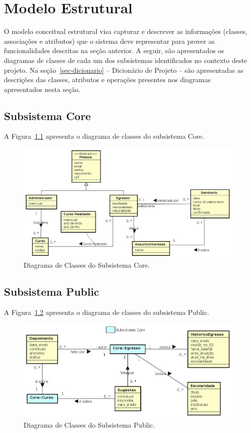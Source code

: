 
\chapter{Modelo Estrutural}
\label{sec-modelo-estrutural}

O modelo conceitual estrutural visa capturar e descrever as informações (classes, associações e atributos) que o sistema deve representar para prover as funcionalidades descritas na seção anterior. A seguir, são apresentados os diagramas de classes de cada um dos subsistemas identificados no contexto deste projeto. Na seção~\ref{sec-dicionario} – Dicionário de Projeto – são apresentadas as descrições das classes, atributos e operações presentes nos diagramas apresentados nesta seção.


\section{Subsistema Core}

A Figura~\ref{figura-core-classe} apresenta o diagrama de classes do subsistema Core.

\begin{figure}[h]
  \centering
  \includegraphics[width=1\textwidth]{figuras/diagrama-classe-core}
  \caption{Diagrama de Classes do Subsistema Core.}
  \label{figura-core-classe}
\end{figure} 


\newpage

\section{Subsistema Public}


A Figura~\ref{figura-public-classe} apresenta o diagrama de classes do subsistema Public.

\begin{figure}[h]
  \centering
  \includegraphics[width=1\textwidth]{figuras/diagrama-classe-public.jpg}
  \caption{Diagrama de Classes do Subsistema Public.}
  \label{figura-public-classe}
\end{figure} 
\newpage
